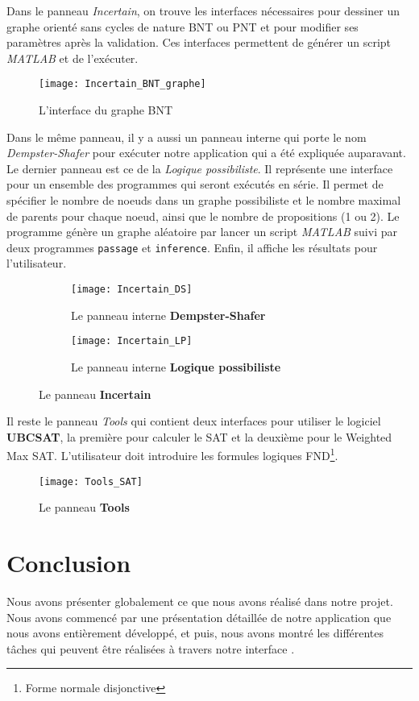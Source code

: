 Dans le panneau \textit{Incertain}, on trouve les interfaces nécessaires pour dessiner un graphe orienté sans
cycles de nature BNT ou PNT et pour modifier ses paramètres après la validation. Ces interfaces permettent de générer
un script \textit{MATLAB} et de l'exécuter.

\begin{figure}[H]
\centering
\texttt{[image: Incertain\_BNT\_graphe]}
\caption{L'interface du graphe BNT}
\end{figure}

Dans le même panneau, il y a aussi un panneau interne qui porte le nom \textit{Dempster-Shafer} pour exécuter
notre application \appname qui a été expliquée auparavant. Le dernier panneau est ce de la \textit{Logique possibiliste}.
Il représente une interface pour un ensemble des programmes qui seront exécutés en série. Il permet de spécifier le nombre
de noeuds dans un graphe possibiliste et le nombre maximal de parents pour chaque noeud, ainsi que le nombre de propositions
(1 ou 2). Le programme génère un graphe aléatoire par lancer un script \textit{MATLAB} suivi par deux programmes
\texttt{passage} et \texttt{inference}. Enfin, il affiche les résultats pour l'utilisateur.

\begin{figure}[H]
\begin{subfigure}{0.49\textwidth}
\texttt{[image: Incertain\_DS]}
\caption{Le panneau interne \textbf{Dempster-Shafer}}
\end{subfigure}
\begin{subfigure}{0.49\textwidth}
\hfill
\texttt{[image: Incertain\_LP]}
\caption{Le panneau interne \textbf{Logique possibiliste}}
\end{subfigure}
\caption{Le panneau \textbf{Incertain}}
\end{figure}

Il reste le panneau \textit{Tools} qui contient deux interfaces pour utiliser le logiciel \textbf{UBCSAT}, la
première pour calculer le SAT et la deuxième pour le Weighted Max SAT. L'utilisateur doit introduire les formules
logiques FND\footnote{Forme normale disjonctive}.

\begin{figure}[H]
\centering
\texttt{[image: Tools\_SAT]}
\caption{Le panneau \textbf{Tools}}
\end{figure}

{}
\section*{Conclusion}

Nous avons présenter globalement ce que nous avons réalisé dans notre projet. Nous avons commencé par une
présentation détaillée de notre application \appname que nous avons entièrement développé, et puis, nous
avons montré les différentes tâches qui peuvent être réalisées à travers notre interface \platformename.